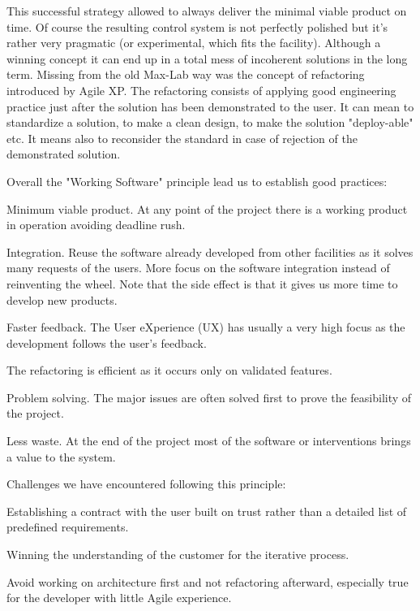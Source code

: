 \documentclass[a4paper,
              ]{jacow}
\begin{document}
This successful strategy allowed to always deliver the minimal viable product on time. Of course the resulting control system is not perfectly polished but it's rather very pragmatic (or experimental, which fits the facility). Although a winning concept it can end up in a total mess of incoherent solutions in the long term. Missing from the old Max-Lab way was the concept of refactoring introduced by Agile XP. The refactoring consists of applying good engineering practice just after the solution has been demonstrated to the user. It can mean to standardize a solution, to make a clean design, to make the solution "deploy-able" etc. It means also to reconsider the standard in case of rejection of the demonstrated solution.

Overall the "Working Software" principle lead us to establish good practices:
\begin{Itemize}
      \item Minimum viable product. At any point of the project there is a working product in operation avoiding deadline rush.
      \item Integration. Reuse the software already developed from other facilities as it solves many requests of the users. More focus on the software integration instead of reinventing the wheel. Note that the side effect is that it gives us more time to develop new products.
      \item Faster feedback. The User eXperience (UX) has usually a very high focus as the development follows the user's feedback. 
      \item The refactoring is efficient as it occurs only on validated features.
      \item Problem solving. The major issues are often solved first to prove the feasibility of the project.
      \item Less waste. At the end of the project most of the software or interventions brings a value to the system.
\end{Itemize}
Challenges we have encountered following this principle:
\begin{Itemize}
      \item Establishing a contract with the user built on trust rather than a detailed list of predefined requirements.
      \item Winning the understanding of the customer for the iterative process.
      \item Avoid working on architecture first and not refactoring afterward, especially true for the developer with little Agile experience.
\end{Itemize}
\end{document}
